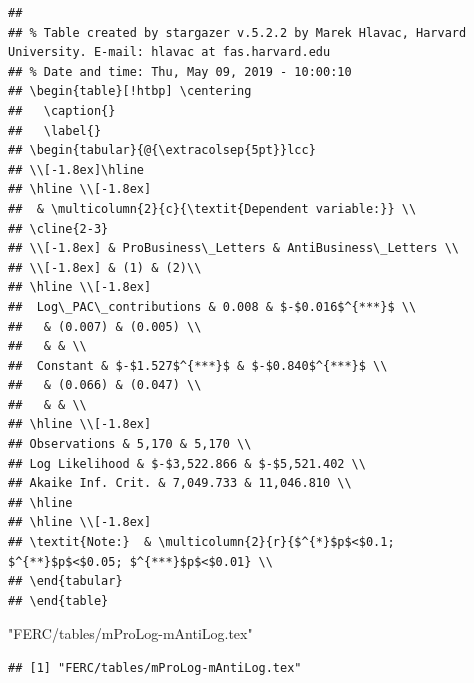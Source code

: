 \documentclass[]{article}
\newenvironment{Shaded}{\begin{snugshade}}{\end{snugshade}}
\newcommand{\StringTok}[1]{\textcolor[rgb]{0.31,0.60,0.02}{#1}}
\begin{document}
\begin{verbatim}
## 
## % Table created by stargazer v.5.2.2 by Marek Hlavac, Harvard University. E-mail: hlavac at fas.harvard.edu
## % Date and time: Thu, May 09, 2019 - 10:00:10
## \begin{table}[!htbp] \centering 
##   \caption{} 
##   \label{} 
## \begin{tabular}{@{\extracolsep{5pt}}lcc} 
## \\[-1.8ex]\hline 
## \hline \\[-1.8ex] 
##  & \multicolumn{2}{c}{\textit{Dependent variable:}} \\ 
## \cline{2-3} 
## \\[-1.8ex] & ProBusiness\_Letters & AntiBusiness\_Letters \\ 
## \\[-1.8ex] & (1) & (2)\\ 
## \hline \\[-1.8ex] 
##  Log\_PAC\_contributions & 0.008 & $-$0.016$^{***}$ \\ 
##   & (0.007) & (0.005) \\ 
##   & & \\ 
##  Constant & $-$1.527$^{***}$ & $-$0.840$^{***}$ \\ 
##   & (0.066) & (0.047) \\ 
##   & & \\ 
## \hline \\[-1.8ex] 
## Observations & 5,170 & 5,170 \\ 
## Log Likelihood & $-$3,522.866 & $-$5,521.402 \\ 
## Akaike Inf. Crit. & 7,049.733 & 11,046.810 \\ 
## \hline 
## \hline \\[-1.8ex] 
## \textit{Note:}  & \multicolumn{2}{r}{$^{*}$p$<$0.1; $^{**}$p$<$0.05; $^{***}$p$<$0.01} \\ 
## \end{tabular} 
## \end{table}
\end{verbatim}

\begin{Shaded}
\begin{Highlighting}[]
\StringTok{"FERC/tables/mProLog-mAntiLog.tex"}
\end{Highlighting}
\end{Shaded}

\begin{verbatim}
## [1] "FERC/tables/mProLog-mAntiLog.tex"
\end{verbatim}
\end{document}
